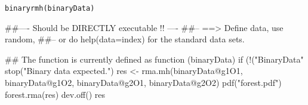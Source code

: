 \begin{Usage}
\begin{verbatim}
binaryrmh(binaryData)
\end{verbatim}
\end{Usage}
\begin{Arguments}
\begin{ldescription}
\item[\code{binaryData}] 
\end{ldescription}
\end{Arguments}
\begin{Examples}
\begin{ExampleCode}
##---- Should be DIRECTLY executable !! ----
##-- ==>  Define data, use random,
##--    or do  help(data=index)  for the standard data sets.

## The function is currently defined as
function (binaryData) 
{
    if (!("BinaryData" %
        stop("Binary data expected.")
    res <- rma.mh(binaryData@g1O1, binaryData@g1O2, binaryData@g2O1, 
        binaryData@g2O2)
    pdf("forest.pdf")
    forest.rma(res)
    dev.off()
    res
  }
\end{ExampleCode}
\end{Examples}


